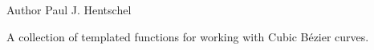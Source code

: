 \begin{DoxyAuthor}{Author}
Paul J. Hentschel
\end{DoxyAuthor}
A collection of templated functions for working with Cubic Bézier curves. 
